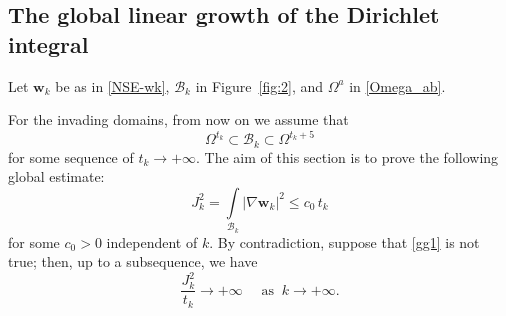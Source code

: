 \documentclass[11pt]{article}
\numberwithin{equation}{section}
\numberwithin{figure}{section}
\def\we{{\mathbf w}}
\begin{document}
\subsection{The global linear growth of the Dirichlet integral}
\label{poet4}
Let $\we_k$ be as in \eqref{NSE-wk},
$\mathcal{B}_k$ in Figure~\ref{fig:2}, and $\Omega^a$ in \eqref{Omega_ab}.

For the invading domains, from now on we assume that
\begin{equation}\label{ug7}
\Omega^{t_k}\subset  \mathcal{B}_k\subset \Omega^{t_k+5}\end{equation}
for some sequence of $t_k \to+\infty$. The aim of this section is to prove the following global estimate:
\begin{equation}\label{gg1}
J^2_k=\int\limits_{  \mathcal{B}_k}|\nabla\we_k|^2\le c_0 \,t_k
\end{equation}
for some $c_0>0$ independent of $k$. By contradiction, suppose that \eqref{gg1} is not true; then, up to a subsequence, we have
\begin{equation}\label{gg3-0}
\frac{J_k^2}{t_k}\to+\infty\quad\mbox{ as }\ k \to +\infty.
\end{equation}
\end{document}
